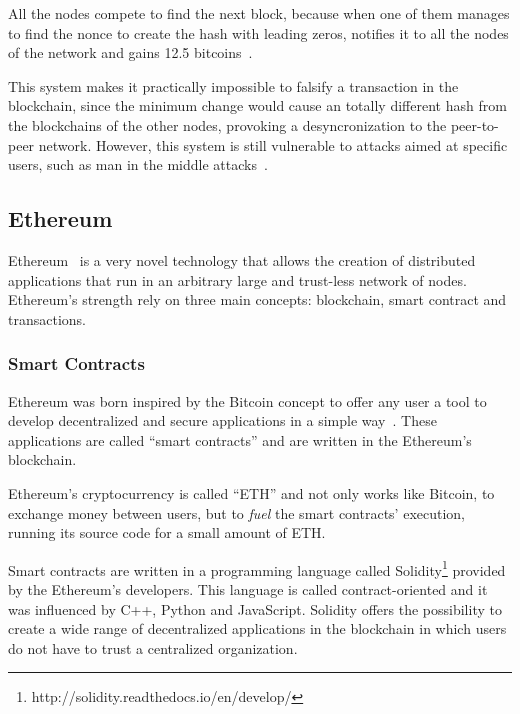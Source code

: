 
All the nodes compete to find the next block, because when one of them manages
to find the nonce to create the hash with leading zeros, notifies it to all the
nodes of the network and gains 12.5 bitcoins~\cite{barber2012bitter}.

This system makes it practically impossible to falsify a transaction in the
blockchain, since the minimum change would cause an totally different hash from
the blockchains of the other nodes, provoking a desyncronization to the
peer-to-peer network. However, this system is still vulnerable to attacks aimed
at specific users, such as man in the middle attacks~\cite{moore2013beware}.

\subsection{Ethereum}
\label{tb:eth}
Ethereum~\cite{buterin2014ethereum} is a very novel technology that allows the
creation of distributed applications that run in an arbitrary large and
trust-less network of nodes. Ethereum's strength rely on three main concepts:
blockchain, smart contract and transactions.

\subsubsection*{Smart Contracts}
\label{tb:cryptos:sm}

Ethereum was born inspired by the Bitcoin concept to offer any user a tool to
develop decentralized and secure applications in a simple
way~\cite{buterin2014ethereum}. These applications are called ``smart
contracts'' and are written in the Ethereum's blockchain.

Ethereum's cryptocurrency is called ``ETH'' and not only works like Bitcoin, to
exchange money between users, but to \emph{fuel} the smart contracts' execution,
running its source code for a small amount of ETH.

Smart contracts are written in a programming language called
Solidity\footnote{http://solidity.readthedocs.io/en/develop/} provided by the
Ethereum's developers. This language is called contract-oriented and it was
influenced by C++, Python and JavaScript. Solidity offers the possibility to
create a wide range of decentralized applications in the blockchain in which
users do not have to trust a centralized organization.

